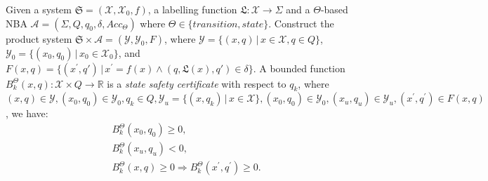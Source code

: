 \documentclass[acmlarge]{acmart}
\begin{document}
\begin{definition}
  \label{state-safety-certificate-definition}
  Given a system $\mathfrak{S} = (\mathcal{X}, \mathcal{X}_0, f)$, a labelling function $\mathfrak{L}:\mathcal{X} \rightarrow \Sigma$ and a $\Theta$-based NBA $\mathcal{A}=(\Sigma, Q, q_0, \delta, Acc_{\Theta})$ where $\Theta \in \{transition, state\}$. Construct the product system $\mathfrak{S} \times \mathcal{A} = (\mathcal{Y}, \mathcal{Y}_0, F)$, where $\mathcal{Y} = \{(x, q) \,|\, x \in \mathcal{X}, q \in Q \}$, $\mathcal{Y}_0 = \{ (x_0, q_0) \,|\, x_0 \in \mathcal{X}_0 \}$, and $F(x,q) = \{(x^{\prime}, q') \,|\, x^{\prime} = f(x) \land (q, \mathfrak{L}(x), q') \in \delta\}$. A bounded function $B^{\Theta}_{k}(x, q): \mathcal{X} \times Q \rightarrow \mathbb{R}$ is a \emph{state safety certificate} with respect to $q_k$, where $(x,q) \in \mathcal{Y}, (x_0, q_0) \in \mathcal{Y}_0, q_k \in Q, \mathcal{Y}_u = \{(x, q_k) \,|\, x \in \mathcal{X}\}, (x_0, q_0) \in \mathcal{Y}_0, (x_u, q_u) \in \mathcal{Y}_u, (x^{\prime}, q^{\prime}) \in F(x, q)$, we have:
  \begin{align}
    &B^{\Theta}_{k}(x_0, q_0) \geq 0, \label{bsinn1} \\ %
    &B^{\Theta}_{k}(x_u, q_u) < 0, \label{bsun1} \\ %
    &B^{\Theta}_{k}(x, q) \geq 0 \Rightarrow B^{\Theta}_{k}(x^{\prime}, q^{\prime}) \geq 0. \label{bstnn1} %
  \end{align}
\end{definition}





\end{document}
